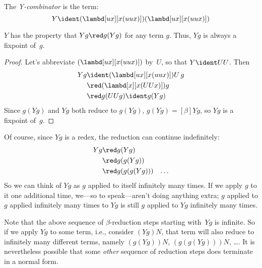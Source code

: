 \documentclass[../../../include/open-logic-section]{subfiles}
\begin{document}
\begin{defn}
  The \emph{Y-combinator} is the term:
  \[
  Y \ident (\lambd[ux][x(uux)])(\lambd[ux][x(uux)])
  \]
\end{defn}

\begin{thm}
  $Y$ has the property that $Yg \red g(Yg)$ for any term $g$. Thus,
  $Yg$ is always a fixpoint of~$g$.
\end{thm}

\begin{proof}
  Let's abbreviate $(\lambd[ux][x(uux)])$ by~$U$, so that $Y \ident UU$. Then
  \begin{align*}
    Y g &\ident (\lambd[ux][x(uux)])U\,g \\
    &\red (\lambd[x][x(UUx)])g\\
    & \red g(UUg) \ident g(Yg)
  \end{align*}
  Since $g(Yg)$ and $Yg$ both reduce to $g(Yg)$, $g(Yg) \equal[\beta]
  Yg$, so $Yg$ is a fixpoint of~$g$.
\end{proof}

Of course, since $Yg$ is a redex, the reduction can continue indefinitely:
\begin{align*}
  Y g &\red g (Y g) \\
    &\red g (g (Y g)) \\
    &\red g(g (g (Y g)))
    &\ldots
\end{align*}
So we can think of $Yg$ as $g$ applied to itself infinitely many
times. If we apply $g$ to it one additional time, we---so to
speak---aren't doing anything extra; $g$ applied to $g$ applied
infinitely many times to $Yg$ is still $g$ applied to $Yg$ infinitely
many times.

Note that the above sequence of $\beta$-reduction steps starting
with~$Yg$ is infinite. So if we apply $Yg$ to some term, i.e.,
consider $(Yg)N$, that term will also reduce to infinitely many
different terms, namely $(g(Yg))N$, $(g(g(Yg)))N$, \dots. It is
nevertheless possible that some \emph{other} sequence of reduction
steps does terminate in a normal form.
\end{document}
